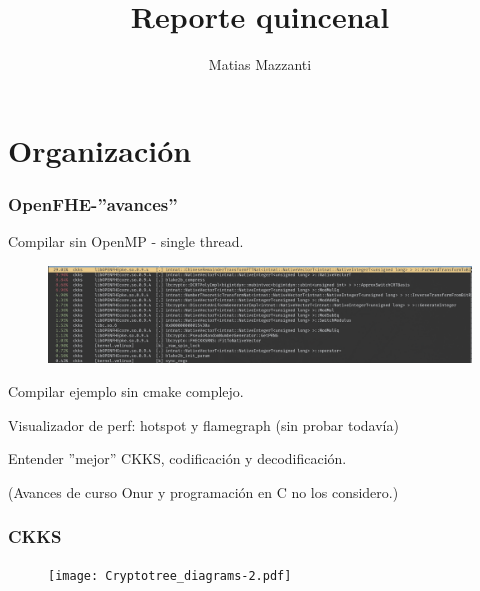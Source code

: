 \documentclass[10pt]{beamer}
\title[Reporte quincenal]{Reporte quincenal}
\author[Matias Mazzanti]{Matias Mazzanti}
\begin{document}
\section{Organización}

\begin{frame}
\frametitle{OpenFHE-''avances''}

Compilar sin OpenMP - single thread.
\vspace{-0.6cm}
\begin{figure}[h!]
    \centering
    \includegraphics[scale=0.18]{perf.png}
\end{figure}
\pause

\vspace{-0.3cm}
Compilar ejemplo sin cmake complejo.

Visualizador de perf: hotspot y flamegraph (sin probar todavía)

\pause
Entender ''mejor'' CKKS, codificación y decodificación.

\pause
(Avances de curso Onur y programación en C no los considero.)
\end{frame}

\begin{frame}
\frametitle{CKKS}
\begin{figure}[h!]
    \centering
    \texttt{[image: Cryptotree\_diagrams-2.pdf]}
\end{figure}


\end{frame}


\end{document}
